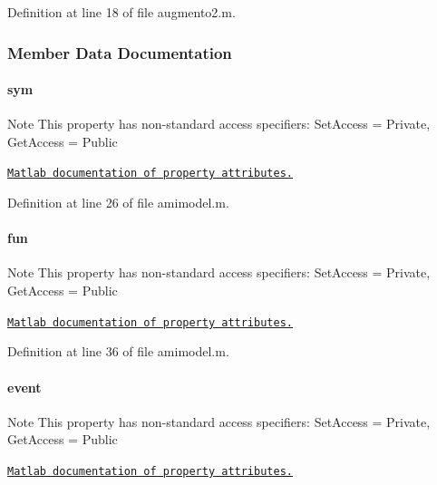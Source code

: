 Definition at line 18 of file augmento2.\+m.



\subsubsection{Member Data Documentation}
\hypertarget{classamimodel_a3c48fff3d28406486a4f1b5e18da7ca6}{}
\paragraph[{sym}]{\setlength{\rightskip}{0pt plus 5cm}sym}\label{classamimodel_a3c48fff3d28406486a4f1b5e18da7ca6}
\begin{DoxyNote}{Note}
This property has non-\/standard access specifiers\+: {\ttfamily Set\+Access = Private, Get\+Access = Public} 

\href{http://www.mathworks.com/help/matlab/matlab_oop/property-attributes.html}{\tt Matlab documentation of property attributes.} 
\end{DoxyNote}


Definition at line 26 of file amimodel.\+m.

\hypertarget{classamimodel_a743fa290dbc0a67a3843d5ab0426e9b4}{}
\paragraph[{fun}]{\setlength{\rightskip}{0pt plus 5cm}fun}\label{classamimodel_a743fa290dbc0a67a3843d5ab0426e9b4}
\begin{DoxyNote}{Note}
This property has non-\/standard access specifiers\+: {\ttfamily Set\+Access = Private, Get\+Access = Public} 

\href{http://www.mathworks.com/help/matlab/matlab_oop/property-attributes.html}{\tt Matlab documentation of property attributes.} 
\end{DoxyNote}


Definition at line 36 of file amimodel.\+m.

\hypertarget{classamimodel_a3b65133bb9997cd1ccf311af0927fc9e}{}
\paragraph[{event}]{\setlength{\rightskip}{0pt plus 5cm}event}\label{classamimodel_a3b65133bb9997cd1ccf311af0927fc9e}
\begin{DoxyNote}{Note}
This property has non-\/standard access specifiers\+: {\ttfamily Set\+Access = Private, Get\+Access = Public} 

\href{http://www.mathworks.com/help/matlab/matlab_oop/property-attributes.html}{\tt Matlab documentation of property attributes.} 
\end{DoxyNote}


